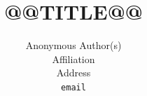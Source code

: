\documentclass{article}
\title{@@TITLE@@}
\author{%
  Anonymous Author(s)\\
  Affiliation\\
  Address\\
  \texttt{email}
}
\begin{document}
\maketitle

\begin{abstract}

\end{abstract}










\appendix

\end{document}
